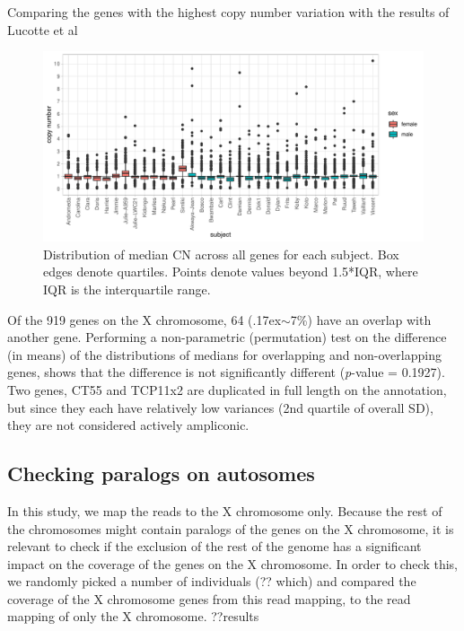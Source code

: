 Comparing the genes with the highest copy number variation with the results of Lucotte et al





\begin{figure}[h] 
  \centering
  \includegraphics[scale=0.78]{figures/fig_qc_subjects_simliki_1.pdf}
  \caption{Distribution of median CN across all genes for each subject. Box edges denote quartiles. Points denote values beyond 1.5*IQR, where IQR is the interquartile range.}
  \label{fig:qc_subjects_simliki}
\end{figure}



\noindent Of the 919 genes on the X chromosome, 64 ({\raise.17ex\hbox{$\scriptstyle\sim$}}7\%) have an overlap with another gene. Performing a non-parametric (permutation) test on the difference (in means) of the distributions of medians for overlapping and non-overlapping genes, shows that the difference is not significantly different (\textit{p}-value = 0.1927).
Two genes, {\footnotesize CT55} and {\footnotesize TCP11x2} are duplicated in full length on the annotation, but since they each have relatively low variances (2nd quartile of overall SD), they are not considered actively ampliconic.

\subsection*{Checking paralogs on autosomes}
In this study, we map the reads to the X chromosome only. Because the rest of the chromosomes might contain paralogs of the genes on the X chromosome, it is relevant to check if the exclusion of the rest of the genome has a significant impact on the coverage of the genes on the X chromosome. In order to check this, we randomly picked a number of individuals (?? which) and compared the coverage of the X chromosome genes from this read mapping, to the read mapping of only the X chromosome. ??results




